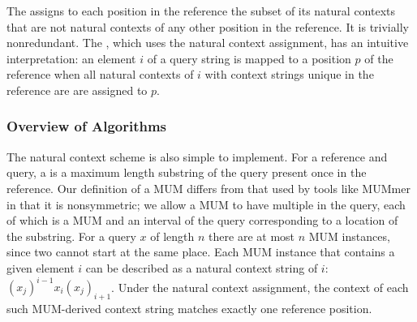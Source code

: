 
The  assigns to each position in the reference the subset of its natural contexts that are not natural contexts of any other position in the reference. It is trivially nonredundant.
The , which uses the natural context assignment, has an intuitive interpretation: an element $i$ of a query string is mapped to a position $p$ of the reference when all natural contexts of $i$ with context strings unique in the reference are are assigned to $p$.

\subsubsection{Overview of Algorithms}
The natural context scheme is also simple to implement. For a reference and query, a  is a maximum length substring of the query present once in the reference. %
Our definition of a MUM differs from that used by tools like MUMmer \citep{delcher1999alignment} in that it is nonsymmetric; we allow a MUM to have multiple  in the query, each of which is a MUM and an interval of the query corresponding to a location of the substring. For a query $x$ of length $n$ there are at most $n$ MUM instances, since two cannot start at the same place. Each MUM instance that contains a given element $i$ can be described as a natural context string of $i$: $(x_j)^{i-1}x_i(x_j)_{i+1}$. Under the natural context assignment, the context of each such MUM-derived context string matches exactly one reference position. %


